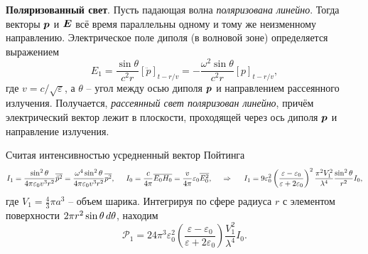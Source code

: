 \textbf{Поляризованный свет}.  Пусть падающая волна \textit{поляризована линейно}. Тогда векторы $\mbox{\boldmath $p$}$ и $\mbox{\boldmath $E$}$ всё время параллельны одному и тому же неизменному направлению. Электрическое поле диполя (в волновой зоне) определяется выражением
\begin{equation*}
    E_1 = \frac{\sin \theta}{c^2 r} \left[\ddot{p}\right]_{t-r/v} = 
    - \frac{\omega^2 \sin \theta}{c^2 r} [p]_{t-r/v},
\end{equation*}
где $v = c/\sqrt{\varepsilon}$, а $\theta$ -- угол между осью диполя $\mbox{\boldmath $p$}$ и направлением рассеянного излучения. Получается, \textit{рассеянный свет поляризован линейно}, причём электрический вектор лежит в плоскости, проходящей через ось диполя $\mbox{\boldmath $p$}$ и направление излучения. 



Считая интенсивностью усредненный вектор Пойтинга
\begin{equation*}
    I_1 = \frac{\sin^2 \theta}{4 \pi \varepsilon_0 v^3 r^2} \overline{\ddot{p}^2} = 
    \frac{\omega^4 \sin^2 \theta}{4 \pi \varepsilon_0 v^3 r^2} \overline{p^2},
    \hspace{5 mm} 
    I_0 = \frac{c}{4\pi} \overline{E_0 H_0} = \frac{v}{4\pi} \varepsilon_0 \overline{E_0^2},
    \hspace{0.5cm} \Rightarrow \hspace{0.5cm}
    I_1 = 9 \varepsilon_0^2 \left(
        \frac{\varepsilon-\varepsilon_0}{\varepsilon+2 \varepsilon_0}
    \right)^2 \frac{\pi^2 V_1^2}{\lambda^4} \frac{\sin^2 \theta}{r^2} I_0,
\end{equation*}
где $V_1 = \frac{4}{3} \pi a^3$ -- объем шарика. Интегрируя по сфере радиуса $r$ с элементом поверхности $2 \pi r^2 \sin \theta \, d \theta$, находим
\begin{equation*}
    \mathcal P_1 = 24 \pi^3 \varepsilon_0^2 \left(
        \frac{\varepsilon-\varepsilon_0}{\varepsilon+2\varepsilon_0}
    \right) \frac{V_1^2}{\lambda^4} I_0.
\end{equation*}


